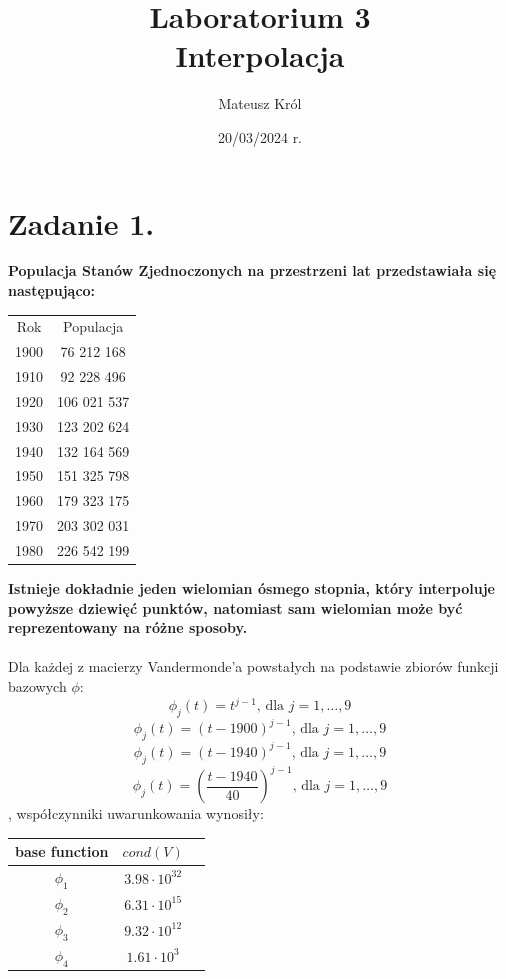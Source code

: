 \documentclass{article}
\title{%
Laboratorium 3\\
  \huge Interpolacja}
\author{Mateusz Król}
\date{20/03/2024 r.}
\begin{document}
\maketitle


\section*{Zadanie 1.}
\textbf{Populacja Stanów Zjednoczonych na przestrzeni lat przedstawiała
się następująco:}
\begin{center}
  \begin{tabular}{c c} 
   Rok & Populacja\\
   1900 & 76 212 168\\
   1910 & 92 228 496\\
   1920 & 106 021 537\\
   1930 & 123 202 624\\
   1940 & 132 164 569\\
   1950 & 151 325 798\\
   1960 & 179 323 175\\
   1970 & 203 302 031\\
   1980 &226 542 199
  \end{tabular}
\end{center}
\textbf{Istnieje dokładnie jeden wielomian ósmego stopnia, który interpoluje
 powyższe dziewięć punktów, natomiast sam wielomian może być reprezentowany na różne sposoby.}
\\\\
Dla każdej z macierzy Vandermonde'a powstałych na podstawie zbiorów funkcji 
bazowych $\phi$:
$$ \phi_j(t) = t^{j-1}\mbox{, dla } j = 1,\dots,9$$
$$ \phi_j(t) = (t-1900)^{j-1}\mbox{, dla } j = 1,\dots,9$$
$$ \phi_j(t) = (t-1940)^{j-1}\mbox{, dla } j = 1,\dots,9$$
$$ \phi_j(t) = \left(\frac{t-1940}{40}\right)^{j-1} \mbox{, dla } j = 1,\dots,9$$
, współczynniki uwarunkowania wynosiły:
\begin{center}
  \begin{tabular}{  |c|c|c| } 
   \hline
   base function & $cond(V)$\\
   \hline
   $\phi_1$ & $3.98 \cdot 10^{32}$ \\
   \hline
   $\phi_2$ & $6.31 \cdot 10^{15}$ \\
   \hline
   $\phi_3$ & $9.32 \cdot 10^{12}$ \\
   \hline
   $\phi_4$ & $1.61 \cdot 10^{3}$ \\
   \hline
  \end{tabular}
\end{center}
\end{document}
